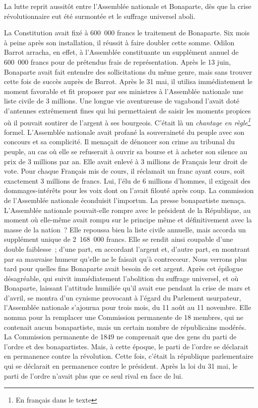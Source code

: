 \documentclass[french,twoside]{book} %
\newcommand\chaptercont{} %
\begin{document}
\chaptercont
\noindent La lutte reprit aussitôt entre l’Assemblée nationale et Bonaparte, dès que la crise révolutionnaire eut été surmontée et le suffrage universel aboli.\par
La Constitution avait fixé à 600 000 francs le traitement de Bonaparte. Six mois à peine après son installation, il réussit à faire doubler cette somme. Odilon Barrot arracha, en effet, à l’Assemblée constituante un supplément annuel de 600 000 francs pour de prétendus frais de représentation. Après le 13 juin, Bonaparte avait fait entendre des sollicitations du même genre, mais sans trouver cette fois de succès auprès de Barrot. Après le 31 mai, il utilisa immédiatement le moment favorable et fit proposer par ses ministres à l’Assemblée nationale une liste civile de 3 millions. Une longue vie aventureuse de vagabond l’avait doté d’antennes extrêmement fines qui lui permettaient de saisir les moments propices où il pouvait soutirer de l’argent à ses bourgeois. C’était là un \emph{chantage en règle\footnote{En français dans le texte}} formel. L’Assemblée nationale avait profané la souveraineté du peuple avec son concours et sa complicité. Il menaçait de dénoncer son crime au tribunal du peuple, au cas où elle se refuserait à ouvrir sa bourse et à acheter son silence au prix de 3 millions par an. Elle avait enlevé à 3 millions de Français leur droit de vote. Pour chaque Français mis de cours, il réclamait un franc ayant cours, soit exactement 3 millions de francs. Lui, l’élu de 6 millions d’hommes, il exigeait des dommages-intérêts pour les voix dont on l’avait filouté après coup. La commission de l’Assemblée nationale éconduisit l’importun. La presse bonapartiste menaça. L’Assemblée nationale pouvait-elle rompre avec le président de la République, au moment où elle-même avait rompu sur le principe même et définitivement avec la masse de la nation ? Elle repoussa bien la liste civile annuelle, mais accorda un supplément unique de 2 168 000 francs. Elle se rendit ainsi coupable d’une double faiblesse ; d’une part, en accordant l’argent et, d’autre part, en montrant par sa mauvaise humeur qu’elle ne le faisait qu’à contrecœur. Nous verrons plus tard pour quelles fins Bonaparte avait besoin de cet argent. Après cet épilogue désagréable, qui suivit immédiatement l’abolition du suffrage universel, et où Bonaparte, laissant l’attitude humiliée qu’il avait eue pendant la crise de mars et d’avril, se montra d’un cynisme provocant à l’égard du Parlement usurpateur, l’Assemblée nationale s’ajourna pour trois mois, du 11 août au 11 novembre. Elle nomma pour la remplacer une Commission permanente de 18 membres, qui ne contenait aucun bonapartiste, mais un certain nombre de républicains modérés. La Commission permanente de 1849 ne comprenait que des gens du parti de l’ordre et des bonapartistes. Mais, à cette époque, le parti de l’ordre se déclarait en permanence contre la révolution. Cette fois, c’était la république parlementaire qui se déclarait en permanence contre le président. Après la loi du 31 mai, le parti de l’ordre n’avait plus que ce seul rival en face de lui.\par
\end{document}
